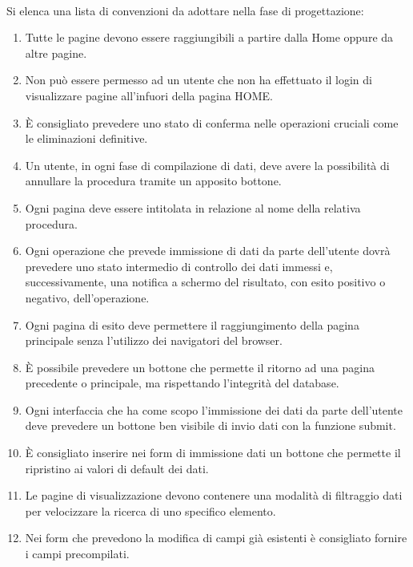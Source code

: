 \documentclass[a4paper, 12pt]{report}
\begin{document}
            \paragraph{}Si elenca una lista di convenzioni da adottare nella fase di progettazione:
            \begin{enumerate}
                \item Tutte le pagine devono essere raggiungibili a partire dalla Home oppure da altre pagine.
                \item Non può essere permesso ad un utente che non ha effettuato il login di visualizzare pagine all'infuori della pagina HOME.
                \item È consigliato prevedere uno stato di conferma nelle operazioni cruciali come le eliminazioni definitive.
                \item Un utente, in ogni fase di compilazione di dati, deve avere la possibilità di annullare la procedura tramite un apposito bottone.
                \item Ogni pagina deve essere intitolata in relazione al nome della relativa procedura.
                \item Ogni operazione che prevede immissione di dati da parte dell'utente dovrà prevedere uno stato intermedio di controllo dei dati immessi e, successivamente, una notifica a schermo del risultato, con esito positivo o negativo, dell'operazione.
                \item Ogni pagina di esito deve permettere il raggiungimento della pagina principale senza l'utilizzo dei navigatori del browser.
                \item È possibile prevedere un bottone che permette il ritorno ad una pagina precedente o principale, ma rispettando l'integrità del database.
                \item Ogni interfaccia che ha come scopo l'immissione dei dati da parte dell'utente deve prevedere un bottone ben visibile di invio dati con la funzione submit.
                \item È consigliato inserire nei form di immissione dati un bottone che permette il ripristino ai valori di default dei dati.
                \item Le pagine di visualizzazione devono contenere una modalità di filtraggio dati per velocizzare la ricerca di uno specifico elemento.
                \item Nei form che prevedono la modifica di campi già esistenti è consigliato fornire i campi precompilati.
            \end{enumerate}
        \clearpage
\end{document}
